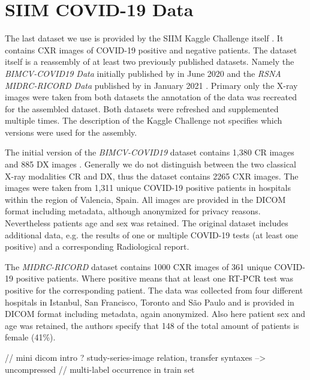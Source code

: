 \section{SIIM COVID-19 Data}\label{data:siim}

The last dataset we use is provided by the SIIM Kaggle Challenge itself \autocite{SIIMKaggle}. It contains \ac{CXR} images of COVID-19 positive and negative patients. The dataset itself is a reassembly of at least two previously published datasets. Namely the \textit{BIMCV-COVID19 Data} initially published by \citeauthor{vaya2020bimcv} in June 2020 \autocite{vaya2020bimcv} and the \textit{RSNA MIDRC-RICORD Data} published by \citeauthor{tsai2021rsna} in January 2021 \autocite{tsai2021rsna}. Primary only the X-ray images were taken from both datasets the annotation of the data was recreated for the assembled dataset. Both datasets were refreshed and supplemented multiple times. The description of the Kaggle Challenge not specifies which versions were used for the assembly.

The initial version of the \textit{BIMCV-COVID19} dataset contains 1,380 CR images and 885 DX images \autocite{vaya2020bimcv}. Generally we do not distinguish between the two classical X-ray modalities CR and DX, thus the dataset contains 2265 CXR images. The images were taken from 1,311 unique COVID-19 positive patients in hospitals within the region of Valencia, Spain. All images are provided in the DICOM format including metadata, although anonymized for privacy reasons. Nevertheless patients age and sex was retained. The original dataset includes additional data, e.g. the results of one or multiple COVID-19 tests (at least one positive) and a corresponding Radiological report.

The \textit{MIDRC-RICORD} dataset contains 1000 CXR images of 361 unique COVID-19 positive patients. Where positive means that at least one \ac{RT-PCR} test was positive for the corresponding patient. The data was collected from four different hospitals in Istanbul, San Francisco, Toronto and São Paulo and is provided in DICOM format including metadata, again anonymized. Also here patient sex and age was retained, the authors specify that 148 of the total amount of patients is female (41\%).




// mini dicom intro ? study-series-image relation, transfer syntaxes --> uncompressed
// multi-label occurrence in train set

